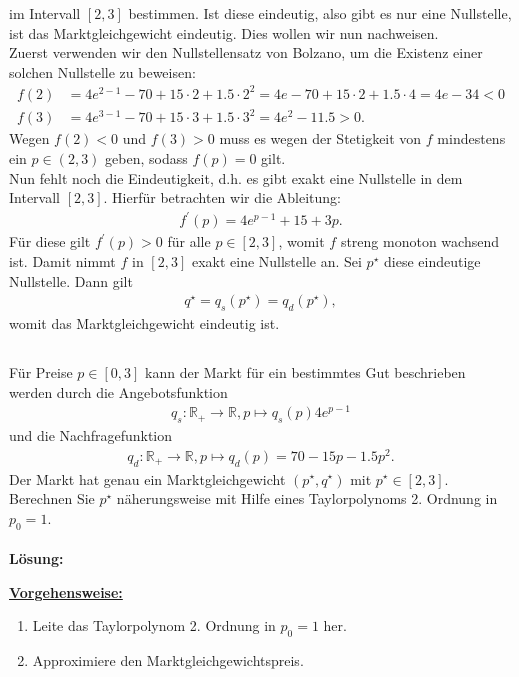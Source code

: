 im Intervall $ [2,3] $ bestimmen.
Ist diese eindeutig, also gibt es nur eine Nullstelle, ist das Marktgleichgewicht eindeutig. Dies wollen wir nun nachweisen.\\
Zuerst verwenden wir den Nullstellensatz von Bolzano, um die Existenz einer solchen Nullstelle zu beweisen:
\begin{align*}
f(2) &= 
4 e^{2-1} - 70 + 15 \cdot 2 + 1.5 \cdot 2^2
=
4 e - 70 + 15 \cdot 2 + 1.5 \cdot 4
= 4 e -34 < 0\\
f(3) &= 
4 e^{3-1} - 70 + 15 \cdot 3 + 1.5 \cdot 3^2
=4 e^2 - 11.5 >0.
\end{align*}
Wegen $ f(2)< 0  $ und $ f(3) > 0  $ muss es wegen der Stetigkeit von $ f $ mindestens ein $ p \in (2,3) $ geben, sodass $ f(p) = 0 $ gilt.\\
Nun fehlt noch die Eindeutigkeit, d.h. es gibt exakt eine Nullstelle in dem Intervall $ [2,3] $. Hierfür betrachten wir die Ableitung:
\begin{align*}
f^\prime(p) = 4 e^{p-1} + 15 +3 p.
\end{align*}
Für diese gilt $ f^\prime(p) > 0  $ für alle $ p \in [2,3] $, womit $ f  $ streng monoton wachsend ist.
Damit nimmt $ f $ in $ [2,3] $ exakt eine Nullstelle an.
Sei $ p^\star  $ diese eindeutige Nullstelle. Dann gilt
\begin{align*}
q^\star = q_s(p^\star)  = q_d(p^\star),
\end{align*}
womit das Marktgleichgewicht eindeutig ist.
\newpage

\subsection*{}
Für Preise $ p \in [0,3] $ kann der Markt für ein bestimmtes Gut beschrieben werden durch die Angebotsfunktion
\begin{align*}
q_s : \mathbb{R}_+ \to \mathbb{R}, p \mapsto q_s(p) 4 e^{p-1}
\end{align*}
und die Nachfragefunktion 
\begin{align*}
q_d: \mathbb{R}_+ \to \mathbb{R}, p \mapsto q_d(p) = 70 -15p -1.5p^2.
\end{align*}
Der Markt hat genau ein Marktgleichgewicht $ (p^\star,q^\star) $ mit $ p^\star \in [2,3] $.\\
Berechnen Sie $ p^\star  $ näherungsweise mit Hilfe eines Taylorpolynoms 2. Ordnung in $ p_0 = 1 $.
\\
\\
\textbf{Lösung:}
\begin{mdframed}
\underline{\textbf{Vorgehensweise:}}
\renewcommand{\labelenumi}{\theenumi.}
\begin{enumerate}
\item Leite das Taylorpolynom 2. Ordnung in $ p_0 = 1 $ her.
\item Approximiere den Marktgleichgewichtspreis.
\end{enumerate}
\end{mdframed}

